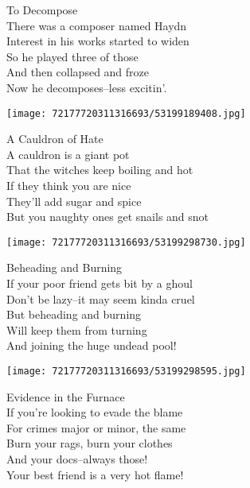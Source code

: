 \documentclass[10pt,letterpaper]{article}
\begin{document}
\begin{center}
To Decompose\\
\vskip 0.2in
There was a composer named Haydn\\
Interest in his works started to widen\\
So he played three of those\\
And then collapsed and froze\\
Now he decomposes--less excitin'.\\
\end{center}
\pagebreak

\begin{center}\texttt{[image: 72177720311316693/53199189408.jpg]}
\end{center}
\begin{center}
A Cauldron of Hate\\
\vskip 0.2in
A cauldron is a giant pot\\
That the witches keep boiling and hot\\
If they think you are nice\\
They'll add sugar and spice\\
But you naughty ones get snails and snot\\
\end{center}
\pagebreak

\begin{center}
\texttt{[image: 72177720311316693/53199298730.jpg]}
\end{center}

\begin{center}
Beheading and Burning\\
\vskip 0.2in
If your poor friend gets bit by a ghoul\\
Don't be lazy--it may seem kinda cruel\\
But beheading and burning\\
Will keep them from turning\\
And joining the huge undead pool!\\
\end{center}
\pagebreak

\begin{center}\texttt{[image: 72177720311316693/53199298595.jpg]}
\end{center}
\begin{center}
Evidence in the Furnace\\
\vskip 0.2in
If you're looking to evade the blame\\
For crimes major or minor, the same\\
Burn your rags, burn your clothes\\
And your docs--always those!\\
Your best friend is a very hot flame!\\
\end{center}
\pagebreak
\end{document}
